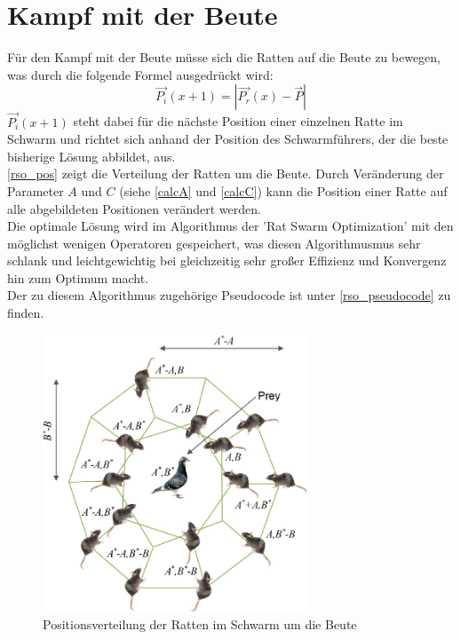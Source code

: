 \section{Kampf mit der Beute}
Für den Kampf mit der Beute müsse sich die Ratten auf die Beute zu bewegen, was durch die folgende Formel ausgedrückt wird: 
\begin{equation}
    \vec{P_i}(x+1) = |\vec{P_r}(x) - \vec{P}|
    \label{calcPNext}
\end{equation}
$\vec{P_i}(x+1)$ steht dabei für die nächste Position einer einzelnen Ratte im Schwarm und richtet sich anhand der Position des Schwarmführers, der die beste bisherige Lösung abbildet, aus.\\
\autoref{rso_pos} zeigt die Verteilung der Ratten um die Beute. Durch Veränderung der Parameter $A$ und $C$ (siehe \autoref{calcA} und \autoref{calcC}) kann die Position einer Ratte auf alle abgebildeten Positionen verändert werden. \\ 
Die optimale Lösung wird im Algorithmus der 'Rat Swarm Optimization' mit den möglichst wenigen Operatoren gespeichert, was diesen Algorithmusmus sehr schlank und leichtgewichtig bei gleichzeitig sehr großer Effizienz und Konvergenz hin zum Optimum macht.\\
Der zu diesem Algorithmus zugehörige Pseudocode ist unter \autoref{rso_pseudocode} zu finden.
\begin{figure}[ht]
    \begin{center}
        \includegraphics[width=0.7\textwidth]{assets/img/12652_2020_2580_Fig1_HTML.png}
        \caption[Positionsverteilung der Ratten im Schwarm um die Beute]{Positionsverteilung der Ratten im Schwarm um die Beute \cite{dhiman_garg_nagar_kumar_dehghani_2020}}
        \label{rso_pos}
    \end{center}
\end{figure}

